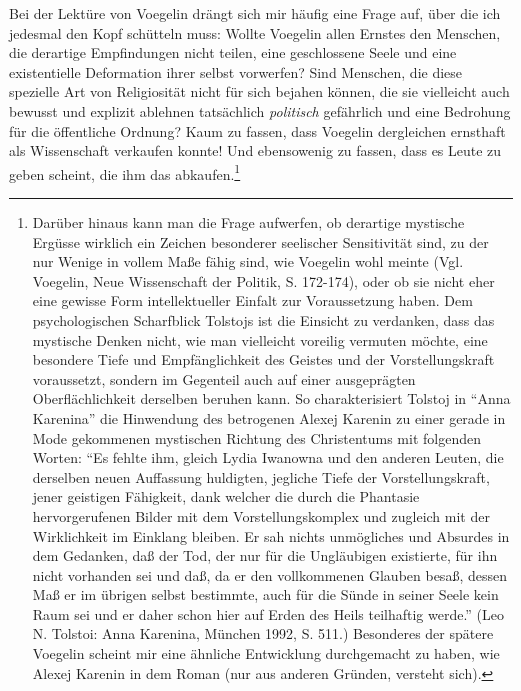  Bei der Lektüre von Voegelin drängt sich mir häufig eine Frage auf, über die
 ich jedesmal den Kopf schütteln muss: Wollte Voegelin allen Ernstes den
 Menschen, die derartige Empfindungen nicht teilen, eine geschlossene Seele
 und eine existentielle Deformation ihrer selbst vorwerfen? Sind Menschen, die
 diese spezielle Art von Religiosität nicht für sich bejahen können, die sie
 vielleicht auch bewusst und explizit ablehnen tatsächlich {\em politisch}
 gefährlich und eine Bedrohung für die öffentliche Ordnung? Kaum zu fassen,
 dass Voegelin dergleichen ernsthaft als Wissenschaft verkaufen konnte! Und
 ebensowenig zu fassen, dass es Leute zu geben scheint, die ihm das
 abkaufen.\footnote{Darüber hinaus kann man die Frage aufwerfen, ob derartige
   mystische Ergüsse wirklich ein Zeichen besonderer seelischer Sensitivität
   sind, zu der nur Wenige in vollem Maße fähig sind, wie Voegelin wohl meinte
   (Vgl. Voegelin, Neue Wissenschaft der Politik, S. 172-174), oder ob sie
   nicht eher eine gewisse Form intellektueller Einfalt zur Voraussetzung
   haben. Dem psychologischen Scharfblick Tolstojs ist die Einsicht zu
   verdanken, dass das mystische Denken nicht, wie man vielleicht voreilig
   vermuten möchte, eine besondere Tiefe und Empfänglichkeit des Geistes und
   der Vorstellungskraft voraussetzt, sondern im Gegenteil auch auf einer
   ausgeprägten Oberflächlichkeit derselben beruhen kann. So charakterisiert
   Tolstoj in "`Anna Karenina"' die Hinwendung des betrogenen Alexej Karenin
   zu einer gerade in Mode gekommenen mystischen Richtung des Christentums mit
   folgenden Worten: "`Es fehlte ihm, gleich Lydia Iwanowna und den anderen
   Leuten, die derselben neuen Auffassung huldigten, jegliche Tiefe der
   Vorstellungskraft, jener geistigen Fähigkeit, dank welcher die durch die
   Phantasie hervorgerufenen Bilder mit dem Vorstellungskomplex und zugleich
   mit der Wirklichkeit im Einklang bleiben. Er sah nichts unmögliches und
   Absurdes in dem Gedanken, daß der Tod, der nur für die Ungläubigen
   existierte, für ihn nicht vorhanden sei und daß, da er den vollkommenen
   Glauben besaß, dessen Maß er im übrigen selbst bestimmte, auch für die
   Sünde in seiner Seele kein Raum sei und er daher schon hier auf Erden des
   Heils teilhaftig werde."' (Leo N.  Tolstoi: Anna Karenina, München 1992, S.
   511.) Besonderes der spätere Voegelin scheint mir eine ähnliche Entwicklung
   durchgemacht zu haben, wie Alexej Karenin in dem Roman (nur aus anderen
   Gründen, versteht sich).}
 
